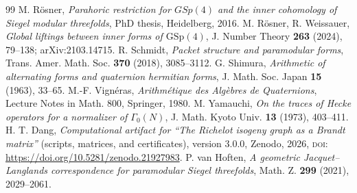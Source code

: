 \documentclass[10pt,a4paper]{amsart}
\providecommand{\doi}[1]{\textsc{doi:}\,\url{https://doi.org/#1}}
\newcommand{\GSp}{\mathrm{GSp}}
\begin{document}
\begin{thebibliography}{99}
 M. R\"osner, \emph{Parahoric restriction for $GSp(4)$ and the inner cohomology of Siegel modular threefolds}, PhD thesis, Heidelberg, 2016.
 M. R\"osner, R. Weissauer, \emph{Global liftings between inner forms of $\GSp(4)$}, J. Number Theory \textbf{263} (2024), 79--138; arXiv:2103.14715.
 R. Schmidt, \emph{Packet structure and paramodular forms}, Trans. Amer. Math. Soc. \textbf{370} (2018), 3085--3112.
 G. Shimura, \emph{Arithmetic of alternating forms and quaternion hermitian forms}, J. Math. Soc. Japan \textbf{15} (1963), 33--65.
 M.-F. Vign\'eras, \emph{Arithm\'etique des Alg\`ebres de Quaternions}, Lecture Notes in Math. 800, Springer, 1980.
 M. Yamauchi, \emph{On the traces of Hecke operators for a normalizer of $\Gamma_0(N)$}, J. Math. Kyoto Univ. \textbf{13} (1973), 403--411.
 H. T. Dang, \emph{Computational artifact for ``The Richelot isogeny graph as a Brandt matrix''} (scripts, matrices, and certificates), version 3.0.0, Zenodo, 2026, \doi{10.5281/zenodo.21927983}.
 P. van Hoften, \emph{A geometric Jacquet--Langlands correspondence for paramodular Siegel threefolds}, Math. Z. \textbf{299} (2021), 2029--2061.
\end{thebibliography}
\end{document}
